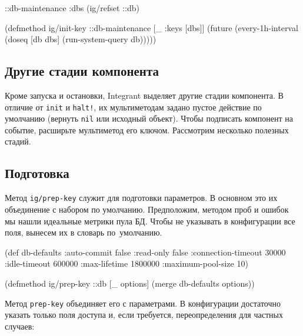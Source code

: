 \else

\begin{english}
  \begin{clojure}
{::db-maintenance {:dbs (ig/refset ::db)}}

(defmethod ig/init-key ::db-maintenance
  [_ {:keys [dbs]}]
  (future
    (every-1h-interval
      (doseq [db dbs]
        (run-system-query db)))))
  \end{clojure}
\end{english}

\fi

\subsection{Другие стадии компонента}


Кроме запуска и остановки, Integrant выделяет другие стадии компонента. В
отличие от \verb|init| и \verb|halt!|, их мультиметодам задано пустое действие
по умолчанию (вернуть \verb|nil| или исходный объект). Чтобы подписать компонент
на событие, расширьте мультиметод его ключом. Рассмотрим несколько полезных
стадий.

\subsection{Подготовка}

Метод \verb|ig/prep-key| служит для подготовки параметров. В основном это их
объединение с набором по умолчанию. Предположим, методом проб и ошибок мы нашли
идеальные метрики пула БД. Чтобы не указывать в конфигурации все поля, вынесем
их в словарь по~умолчанию.

\begin{english}
  \begin{clojure}
(def db-defaults
  {:auto-commit        false
   :read-only          false
   :connection-timeout 30000
   :idle-timeout       600000
   :max-lifetime       1800000
   :maximum-pool-size  10})

(defmethod ig/prep-key ::db
  [_ options]
  (merge db-defaults options))
  \end{clojure}
\end{english}

Метод \verb|prep-key| объединяет его с параметрами. В конфигурации достаточно
указать только поля доступа и, если требуется, переопределения для частных
случаев:

\ifx\DEVICETYPE\MOBILE

